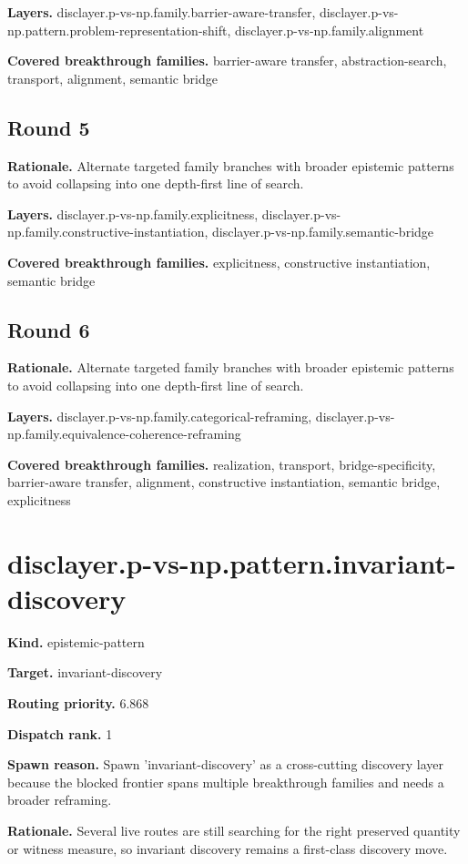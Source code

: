 \documentclass[11pt]{article}
\begin{document}
\textbf{Layers.} disclayer.p-vs-np.family.barrier-aware-transfer, disclayer.p-vs-np.pattern.problem-representation-shift, disclayer.p-vs-np.family.alignment

\textbf{Covered breakthrough families.} barrier-aware transfer, abstraction-search, transport, alignment, semantic bridge
\subsection*{Round 5}
\textbf{Rationale.} Alternate targeted family branches with broader epistemic patterns to avoid collapsing into one depth-first line of search.

\textbf{Layers.} disclayer.p-vs-np.family.explicitness, disclayer.p-vs-np.family.constructive-instantiation, disclayer.p-vs-np.family.semantic-bridge

\textbf{Covered breakthrough families.} explicitness, constructive instantiation, semantic bridge
\subsection*{Round 6}
\textbf{Rationale.} Alternate targeted family branches with broader epistemic patterns to avoid collapsing into one depth-first line of search.

\textbf{Layers.} disclayer.p-vs-np.family.categorical-reframing, disclayer.p-vs-np.family.equivalence-coherence-reframing

\textbf{Covered breakthrough families.} realization, transport, bridge-specificity, barrier-aware transfer, alignment, constructive instantiation, semantic bridge, explicitness
\section{disclayer.p-vs-np.pattern.invariant-discovery}
\textbf{Kind.} epistemic-pattern

\textbf{Target.} invariant-discovery

\textbf{Routing priority.} 6.868

\textbf{Dispatch rank.} 1

\textbf{Spawn reason.} Spawn 'invariant-discovery' as a cross-cutting discovery layer because the blocked frontier spans multiple breakthrough families and needs a broader reframing.

\textbf{Rationale.} Several live routes are still searching for the right preserved quantity or witness measure, so invariant discovery remains a first-class discovery move.
\end{document}
